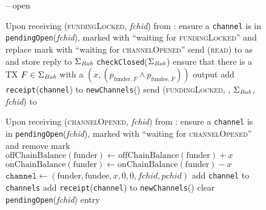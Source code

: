 \begin{figure}[H]
\begin{systembox}{\fpaynet{} -- open}
\begin{algorithmic}[1]
        \State Upon receiving (\textsc{fundingLocked}, \textit{fchid}) from
        \simulator:
        \Indent
          \State ensure a \texttt{channel} is in
          \texttt{pendingOpen}(\textit{fchid}), marked with ``waiting for
          \textsc{fundingLocked}'' and replace mark with ``waiting for
          \textsc{channelOpened}''
          \State send (\textsc{read}) to \ledger{} as \bob{} and store reply
          to $\Sigma_{\mathit{Bob}}$
          \State \texttt{checkClosed}($\Sigma_{\mathit{Bob}}$)
          \label{alg:fpaynet:checkForNew:read:bob}
          \State ensure that there is a TX $F \in \Sigma_{\mathit{Bob}}$ with a
          $\left(x, \left(p_{\mathrm{funder}, F} \wedge p_{\mathrm{fundee},
          F}\right)\right)$ output
          \State add \texttt{receipt}(\texttt{channel}) to
          \texttt{newChannels}(\bob)
          \label{alg:fpaynet:fundingLocked:report}
          \State send (\textsc{fundingLocked}, \bob, $\Sigma_{\mathit{Bob}}$,
          \textit{fchid}) to \simulator
          \label{alg:fpaynet:fundingLocked:sim}
        \EndIndent
        \Statex

        \State Upon receiving (\textsc{channelOpened}, \textit{fchid}) from
        \simulator:
        \Indent
          \State ensure a \texttt{channel} is in
          \texttt{pendingOpen}(\textit{fchid}), marked with ``waiting for
          \textsc{channelOpened}'' and remove mark
          \State $\mathrm{offChainBalance}\left(\mathrm{funder}\right) \gets
          \mathrm{offChainBalance}\left(\mathrm{funder}\right) + x$
          \label{alg:fpaynet:channelOpened:offchain}
          \State $\mathrm{onChainBalance}\left(\mathrm{funder}\right) \gets
          \mathrm{onChainBalance}\left(\mathrm{funder}\right) - x$
          \label{alg:fpaynet:channelOpened:onchain}
          \State $\mathtt{channel} \gets \left(\mathrm{funder}, \mathrm{fundee},
          x, 0, 0, \mathit{fchid}, \mathit{pchid}\right)$
          \State add \texttt{channel} to \texttt{channels}
          \State add \texttt{receipt}(\texttt{channel}) to
          \texttt{newChannels}(\alice)
          \label{alg:fpaynet:channelOpened:report}
          \State clear \texttt{pendingOpen}(\textit{fchid}) entry
        \EndIndent
      \end{algorithmic}
    \end{systembox}
    \caption{}
    \label{alg:fpaynet:open}
  \end{figure}


